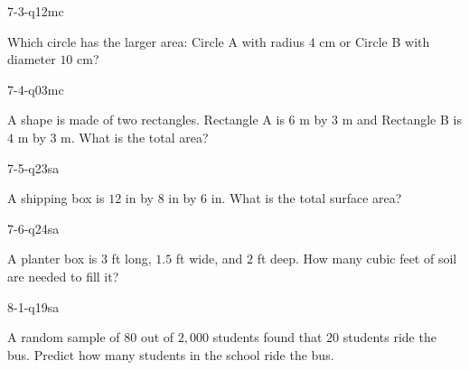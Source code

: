 \begin{practiceQuestion}{7-3-q12}{mc}
\begin{questionText}
Which circle has the larger area: Circle A with radius $4$ cm or Circle B with diameter $10$ cm?
\end{questionText}
\end{practiceQuestion}

\begin{practiceQuestion}{7-4-q03}{mc}
\begin{questionText}
A shape is made of two rectangles. Rectangle A is $6$ m by $3$ m and Rectangle B is $4$ m by $3$ m. What is the total area?
\end{questionText}
\end{practiceQuestion}

\begin{practiceQuestion}{7-5-q23}{sa}
\begin{questionText}
A shipping box is $12$ in by $8$ in by $6$ in. What is the total surface area?
\end{questionText}
\end{practiceQuestion}

\begin{practiceQuestion}{7-6-q24}{sa}
\begin{questionText}
A planter box is $3$ ft long, $1.5$ ft wide, and $2$ ft deep. How many cubic feet of soil are needed to fill it?
\end{questionText}
\end{practiceQuestion}

\begin{practiceQuestion}{8-1-q19}{sa}
\begin{questionText}
A random sample of $80$ out of $2{,}000$ students found that $20$ students ride the bus. Predict how many students in the school ride the bus.
\end{questionText}
\end{practiceQuestion}

